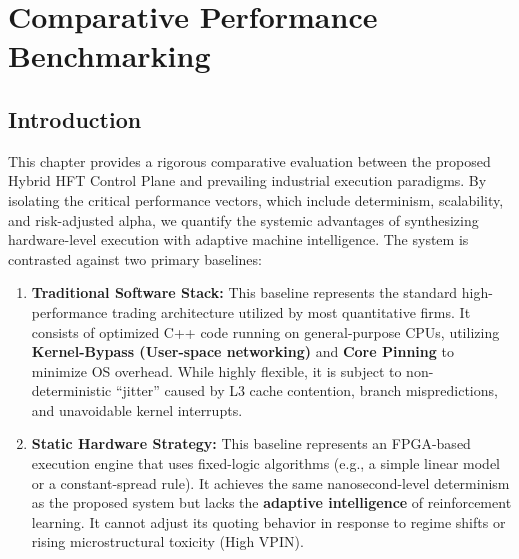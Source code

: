\chapter{Comparative Performance Benchmarking}
\label{ch:benchmarking}

\section{Introduction}
This chapter provides a rigorous comparative evaluation between the proposed Hybrid HFT Control Plane and prevailing industrial execution paradigms. By isolating the critical performance vectors, which include determinism, scalability, and risk-adjusted alpha, we quantify the systemic advantages of synthesizing hardware-level execution with adaptive machine intelligence. The system is contrasted against two primary baselines:

\begin{enumerate}
    \item \textbf{Traditional Software Stack:} This baseline represents the standard high-performance trading architecture utilized by most quantitative firms. It consists of optimized C++ code running on general-purpose CPUs, utilizing \textbf{Kernel-Bypass (User-space networking)} and \textbf{Core Pinning} to minimize OS overhead. While highly flexible, it is subject to non-deterministic ``jitter'' caused by L3 cache contention, branch mispredictions, and unavoidable kernel interrupts.
    \item \textbf{Static Hardware Strategy:} This baseline represents an FPGA-based execution engine that uses fixed-logic algorithms (e.g., a simple linear model or a constant-spread rule). It achieves the same nanosecond-level determinism as the proposed system but lacks the \textbf{adaptive intelligence} of reinforcement learning. It cannot adjust its quoting behavior in response to regime shifts or rising microstructural toxicity (High VPIN).
\end{enumerate}

